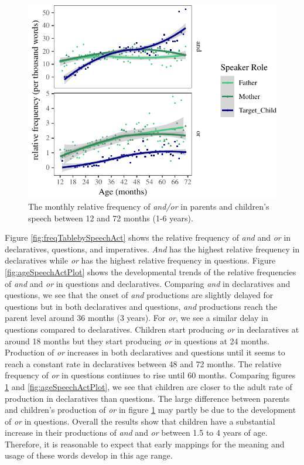 \documentclass[floatsintext,man]{apa6}
\theoremstyle{definition}
\theoremstyle{definition}
\theoremstyle{definition}
\theoremstyle{remark}
\begin{document}
\begin{figure}[tb]

{\centering \includegraphics{figs/agePlot-1} 

}

\caption{The monthly relative frequency of \textit{and/or} in parents and children's speech between 12 and 72 months (1-6 years).}\label{fig:agePlot}
\end{figure}

Figure \ref{fig:freqTablebySpeechAct} shows the relative frequency of
\emph{and} and \emph{or} in declaratives, questions, and imperatives.
\emph{And} has the highest relative frequency in declaratives while
\emph{or} has the highest relative frequency in questions. Figure
\ref{fig:ageSpeechActPlot} shows the developmental trends of the
relative frequencies of \emph{and} and \emph{or} in questions and
declaratives. Comparing \emph{and} in declaratives and questions, we see
that the onset of \emph{and} productions are slightly delayed for
questions but in both declaratives and questions, \emph{and} productions
reach the parent level around 36 months (3 years). For \emph{or}, we see
a similar delay in questions compared to declaratives. Children start
producing \emph{or} in declaratives at around 18 months but they start
producing \emph{or} in questions at 24 months. Production of \emph{or}
increases in both declaratives and questions until it seems to reach a
constant rate in declaratives between 48 and 72 months. The relative
frequency of \emph{or} in questions continues to rise until 60 months.
Comparing figures \ref{fig:agePlot} and \ref{fig:ageSpeechActPlot}, we
see that children are closer to the adult rate of production in
declaratives than questions. The large difference between parents and
children's production of \emph{or} in figure \ref{fig:agePlot} may
partly be due to the development of \emph{or} in questions. Overall the
results show that children have a substantial increase in their
productions of \emph{and} and \emph{or} between 1.5 to 4 years of age.
Therefore, it is reasonable to expect that early mappings for the
meaning and usage of these words develop in this age range.
\end{document}
